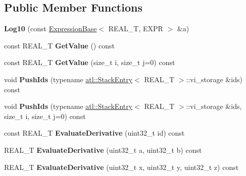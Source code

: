 \subsection*{Public Member Functions}
\begin{DoxyCompactItemize}
\item 
\hypertarget{structatl_1_1_log10_a179bd24f45cb40d8c4c69b399d9ab006}{{\bfseries Log10} (const \hyperlink{structatl_1_1_expression_base}{Expression\+Base}$<$ R\+E\+A\+L\+\_\+\+T, E\+X\+P\+R $>$ \&a)}\label{structatl_1_1_log10_a179bd24f45cb40d8c4c69b399d9ab006}

\item 
\hypertarget{structatl_1_1_log10_a4ef8c45dadaf5851b95dad741f797744}{const R\+E\+A\+L\+\_\+\+T {\bfseries Get\+Value} () const }\label{structatl_1_1_log10_a4ef8c45dadaf5851b95dad741f797744}

\item 
\hypertarget{structatl_1_1_log10_af6ddeb7607474a178aef69daf1cecc6d}{const R\+E\+A\+L\+\_\+\+T {\bfseries Get\+Value} (size\+\_\+t i, size\+\_\+t j=0) const }\label{structatl_1_1_log10_af6ddeb7607474a178aef69daf1cecc6d}

\item 
\hypertarget{structatl_1_1_log10_ada7fc1f52b2b6f91260e01835c368158}{void {\bfseries Push\+Ids} (typename \hyperlink{structatl_1_1_stack_entry}{atl\+::\+Stack\+Entry}$<$ R\+E\+A\+L\+\_\+\+T $>$\+::vi\+\_\+storage \&ids) const }\label{structatl_1_1_log10_ada7fc1f52b2b6f91260e01835c368158}

\item 
\hypertarget{structatl_1_1_log10_afa4734b1fa8a2f019607387bd9c397c2}{void {\bfseries Push\+Ids} (typename \hyperlink{structatl_1_1_stack_entry}{atl\+::\+Stack\+Entry}$<$ R\+E\+A\+L\+\_\+\+T $>$\+::vi\+\_\+storage \&ids, size\+\_\+t i, size\+\_\+t j=0) const }\label{structatl_1_1_log10_afa4734b1fa8a2f019607387bd9c397c2}

\item 
\hypertarget{structatl_1_1_log10_a4e6b29b6764fe0563aa483f3e552bf95}{const R\+E\+A\+L\+\_\+\+T {\bfseries Evaluate\+Derivative} (uint32\+\_\+t id) const }\label{structatl_1_1_log10_a4e6b29b6764fe0563aa483f3e552bf95}

\item 
\hypertarget{structatl_1_1_log10_a852de4fd2d8456c84ca4d923f97886a4}{R\+E\+A\+L\+\_\+\+T {\bfseries Evaluate\+Derivative} (uint32\+\_\+t a, uint32\+\_\+t b) const }\label{structatl_1_1_log10_a852de4fd2d8456c84ca4d923f97886a4}

\item 
\hypertarget{structatl_1_1_log10_aac9a5699adc29f8abb687400f6b1781f}{R\+E\+A\+L\+\_\+\+T {\bfseries Evaluate\+Derivative} (uint32\+\_\+t x, uint32\+\_\+t y, uint32\+\_\+t z) const }\label{structatl_1_1_log10_aac9a5699adc29f8abb687400f6b1781f}


\end{DoxyCompactItemize}
